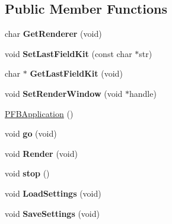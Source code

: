 \subsection*{Public Member Functions}
\begin{DoxyCompactItemize}
\item 
\hypertarget{class_p_f_b_application_a3383fc0a8b2063640397f44e2b0885fc}{
char {\bfseries GetRenderer} (void)}
\label{class_p_f_b_application_a3383fc0a8b2063640397f44e2b0885fc}

\item 
\hypertarget{class_p_f_b_application_ad0ff88eeb0be3cce7c86dba55f0591f5}{
void {\bfseries SetLastFieldKit} (const char $\ast$str)}
\label{class_p_f_b_application_ad0ff88eeb0be3cce7c86dba55f0591f5}

\item 
\hypertarget{class_p_f_b_application_a3570af4a30928fb40776782cf4619cf7}{
char $\ast$ {\bfseries GetLastFieldKit} (void)}
\label{class_p_f_b_application_a3570af4a30928fb40776782cf4619cf7}

\item 
\hypertarget{class_p_f_b_application_a940cbd365f35d1831998a831cf066aa1}{
void {\bfseries SetRenderWindow} (void $\ast$handle)}
\label{class_p_f_b_application_a940cbd365f35d1831998a831cf066aa1}

\item 
\hyperlink{class_p_f_b_application_a11ea35afe65eed12b9bae10f46ce14b7}{PFBApplication} ()
\item 
\hypertarget{class_p_f_b_application_ab89cbd8700d90c2dc0f776fe0f607326}{
void {\bfseries go} (void)}
\label{class_p_f_b_application_ab89cbd8700d90c2dc0f776fe0f607326}

\item 
\hypertarget{class_p_f_b_application_a89066d679013ca1122e95033e2f72167}{
void {\bfseries Render} (void)}
\label{class_p_f_b_application_a89066d679013ca1122e95033e2f72167}

\item 
\hypertarget{class_p_f_b_application_a50574b1bfd2f81849425e70c220ce932}{
void {\bfseries stop} ()}
\label{class_p_f_b_application_a50574b1bfd2f81849425e70c220ce932}

\item 
\hypertarget{class_p_f_b_application_adf87e792362fc8802b9605db8e698716}{
void {\bfseries LoadSettings} (void)}
\label{class_p_f_b_application_adf87e792362fc8802b9605db8e698716}

\item 
\hypertarget{class_p_f_b_application_a18f523c2adabbeb9acf210b531dc1728}{
void {\bfseries SaveSettings} (void)}
\label{class_p_f_b_application_a18f523c2adabbeb9acf210b531dc1728}


\end{DoxyCompactItemize}
